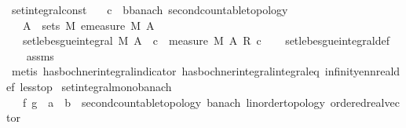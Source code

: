 \begin{isabellebody}
\endisatagproof
{\isafoldproof}%
%
\isadelimproof
\isanewline
%
\endisadelimproof
\isanewline
{}\isamarkupfalse%
\ set{\isacharunderscore}{\kern0pt}integral{\isacharunderscore}{\kern0pt}const{\isacharcolon}{\kern0pt}\isanewline
\ \ \ c\ {\isacharcolon}{\kern0pt}{\isacharcolon}{\kern0pt}\ {\isachardoublequoteopen}{\isacharprime}{\kern0pt}b{\isacharcolon}{\kern0pt}{\isacharcolon}{\kern0pt}{\isacharbraceleft}{\kern0pt}banach{\isacharcomma}{\kern0pt}\ second{\isacharunderscore}{\kern0pt}countable{\isacharunderscore}{\kern0pt}topology{\isacharbraceright}{\kern0pt}{\isachardoublequoteclose}\isanewline
\ \ \ {\isachardoublequoteopen}A\ {\isasymin}\ sets\ M{\isachardoublequoteclose}\ {\isachardoublequoteopen}emeasure\ M\ A\ {\isasymnoteq}\ {\isasyminfinity}{\isachardoublequoteclose}\isanewline
\ \ \ {\isachardoublequoteopen}set{\isacharunderscore}{\kern0pt}lebesgue{\isacharunderscore}{\kern0pt}integral\ M\ A\ {\isacharparenleft}{\kern0pt}{\isasymlambda}{\isacharunderscore}{\kern0pt}{\isachardot}{\kern0pt}\ c{\isacharparenright}{\kern0pt}\ {\isacharequal}{\kern0pt}\ measure\ M\ A\ {\isacharasterisk}{\kern0pt}\isactrlsub R\ c{\isachardoublequoteclose}\isanewline
%
\isadelimproof
\ \ %
\endisadelimproof
%
\isatagproof
{}\isamarkupfalse%
\ set{\isacharunderscore}{\kern0pt}lebesgue{\isacharunderscore}{\kern0pt}integral{\isacharunderscore}{\kern0pt}def\ \isanewline
\ \ \isamarkupfalse%
\ assms\ \isamarkupfalse%
\ {\isacharparenleft}{\kern0pt}metis\ has{\isacharunderscore}{\kern0pt}bochner{\isacharunderscore}{\kern0pt}integral{\isacharunderscore}{\kern0pt}indicator\ has{\isacharunderscore}{\kern0pt}bochner{\isacharunderscore}{\kern0pt}integral{\isacharunderscore}{\kern0pt}integral{\isacharunderscore}{\kern0pt}eq\ infinity{\isacharunderscore}{\kern0pt}ennreal{\isacharunderscore}{\kern0pt}def\ less{\isacharunderscore}{\kern0pt}top{\isacharparenright}{\kern0pt}%
\endisatagproof
{\isafoldproof}%
%
\isadelimproof
\isanewline
%
\endisadelimproof
\isanewline
{}\isamarkupfalse%
\ set{\isacharunderscore}{\kern0pt}integral{\isacharunderscore}{\kern0pt}mono{\isacharunderscore}{\kern0pt}banach{\isacharcolon}{\kern0pt}\isanewline
\ \ \ f\ g\ {\isacharcolon}{\kern0pt}{\isacharcolon}{\kern0pt}\ {\isachardoublequoteopen}{\isacharprime}{\kern0pt}a\ {\isasymRightarrow}\ {\isacharprime}{\kern0pt}b\ {\isacharcolon}{\kern0pt}{\isacharcolon}{\kern0pt}\ {\isacharbraceleft}{\kern0pt}second{\isacharunderscore}{\kern0pt}countable{\isacharunderscore}{\kern0pt}topology{\isacharcomma}{\kern0pt}\ banach{\isacharcomma}{\kern0pt}\ linorder{\isacharunderscore}{\kern0pt}topology{\isacharcomma}{\kern0pt}\ ordered{\isacharunderscore}{\kern0pt}real{\isacharunderscore}{\kern0pt}vector{\isacharbraceright}{\kern0pt}{\isachardoublequoteclose}\isanewline

\end{isabellebody}
